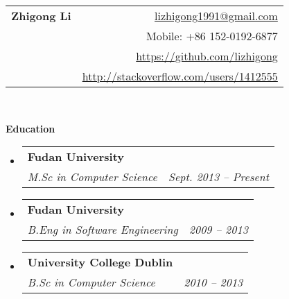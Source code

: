 \documentclass[letterpaper,10pt]{article}
\makeatletter
\newcommand{\resitem}[1]{\item #1 \vspace{-2pt}}
\newcommand{\resheading}[1]{{\large \colorbox{mygrey}{\begin{minipage}{\textwidth}{\textbf{#1 \vphantom{p\^{E}}}}\end{minipage}}}}
\newcommand{\ressubheading}[4]{
\begin{tabular*}{6.5in}{l@{\extracolsep{\fill}}r}
		\textbf{#1} & #2 \\
		#3 & #4 \\
\end{tabular*}\vspace{-6pt}}
\makeatother
\begin{document}
\newcommand{\mywebheader}{
\begin{tabular*}{7in}{l@{\extracolsep{\fill}}r}
	\textbf{{\Huge Zhigong Li}} & \href{mailto:lizhigong1991@gmail.com}{lizhigong1991@gmail.com}\\
     & {Mobile: +86 152-0192-6877}\\
     & \href{https://github.com/lizhigong}{https://github.com/lizhigong} \\
     & \href{http://stackoverflow.com/users/1412555}{http://stackoverflow.com/users/1412555} \\
	\end{tabular*}
\\
\vspace{0.1in}}

\mywebheader


\resheading{Education}
	\begin{itemize}
       \item
			\ressubheading{Fudan University}{}{\emph{M.Sc in Computer Science}}{\emph{Sept. 2013 -- Present}}
			{
                    
			}


    \item
			\ressubheading{Fudan University}{}{\emph{B.Eng in Software Engineering}}{\emph{2009 -- 2013}}
			{
			}
	\item 
			\ressubheading{University College Dublin}{}{\emph{B.Sc in Computer Science}}{\emph{2010 -- 2013}}
	\end{itemize} %
\end{document}
